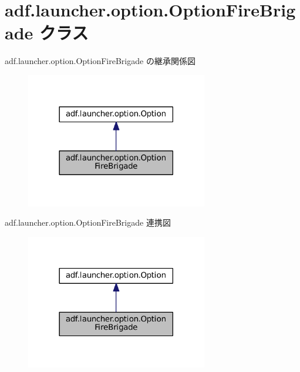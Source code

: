 \hypertarget{classadf_1_1launcher_1_1option_1_1OptionFireBrigade}{}\section{adf.\+launcher.\+option.\+Option\+Fire\+Brigade クラス}
\label{classadf_1_1launcher_1_1option_1_1OptionFireBrigade}


adf.\+launcher.\+option.\+Option\+Fire\+Brigade の継承関係図
\nopagebreak
\begin{figure}[H]
\begin{center}
\leavevmode
\includegraphics[width=225pt]{classadf_1_1launcher_1_1option_1_1OptionFireBrigade__inherit__graph}
\end{center}
\end{figure}


adf.\+launcher.\+option.\+Option\+Fire\+Brigade 連携図
\nopagebreak
\begin{figure}[H]
\begin{center}
\leavevmode
\includegraphics[width=225pt]{classadf_1_1launcher_1_1option_1_1OptionFireBrigade__coll__graph}
\end{center}
\end{figure}

